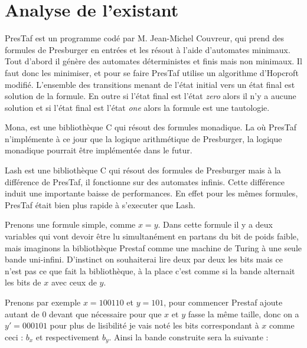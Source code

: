 \section{Analyse de l'existant}

PresTaf est un programme codé par M. Jean-Michel Couvreur, qui prend des formules de Presburger en entrées et les résout à l'aide d'automates minimaux. Tout d'abord il génère des automates déterministes et finis mais non minimaux. Il faut donc les minimiser, et pour se faire PresTaf utilise un algorithme d'Hopcroft modifié. L'ensemble des transitions menant de l'état initial vers un état final est solution de la formule. En outre si l'état final est l'état \emph{zero} alors il n'y a aucune solution et si l'état final est l'état \emph{one} alors la formule est une tautologie.\\\par

Mona, est une bibliothèque C qui résout des formules monadique. La où PresTaf n'implémente à ce jour que la logique arithmétique de Presburger, la logique monadique pourrait être implémentée dans le futur.\\\par

Lash\cite{lash} est une bibliothèque C qui résout des formules de Presburger mais à la différence de PresTaf, il fonctionne sur des automates infinis. Cette différence induit une importante baisse de performances. En effet pour les mêmes formules, PresTaf était bien plus rapide à s'executer que Lash\cite{DBLP:conf/wia/Couvreur04}.\\\par

Prenons une formule simple, comme $x = y$. Dans cette formule il y a deux variables qui vont devoir être lu simultanément en partans du bit de poids faible, mais imaginons la bibliothèque Prestaf comme une machine de Turing à une seule bande uni-infini. D'instinct on souhaiterai lire deux par deux les bits mais ce n'est pas ce que fait la bibliothèque, à la place c'est comme si la bande alternait les bits de $x$ avec ceux de $y$.\\\par
Prenons par exemple $x = 100110$ et $y = 101$, pour commencer Prestaf ajoute autant de 0 devant que nécessaire pour que $x$ et $y$ fasse la même taille, donc on a $y'=000101$ pour plus de lisibilité je vais noté les bits correspondant à $x$ comme ceci : $b_x$ et respectivement $b_y$. Ainsi la bande construite sera la suivante :

